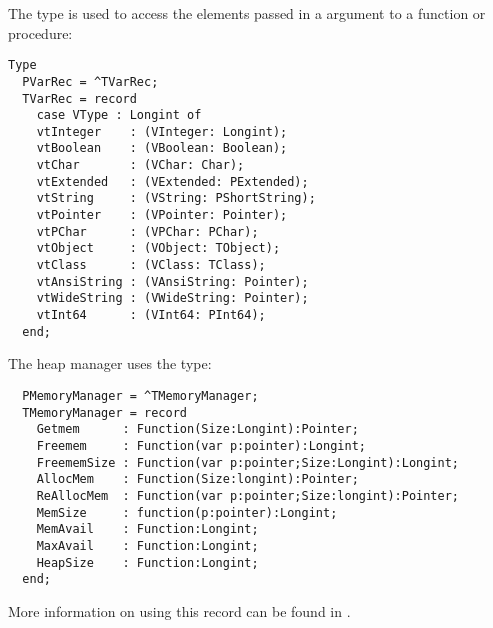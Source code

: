 \documentclass{report}
\begin{document}
The  type is used to access the elements passed in a  argument to a function or procedure:
\begin{verbatim}
Type
  PVarRec = ^TVarRec;
  TVarRec = record   
    case VType : Longint of
    vtInteger    : (VInteger: Longint);
    vtBoolean    : (VBoolean: Boolean);
    vtChar       : (VChar: Char);
    vtExtended   : (VExtended: PExtended);
    vtString     : (VString: PShortString);
    vtPointer    : (VPointer: Pointer);
    vtPChar      : (VPChar: PChar);
    vtObject     : (VObject: TObject);
    vtClass      : (VClass: TClass);  
    vtAnsiString : (VAnsiString: Pointer);   
    vtWideString : (VWideString: Pointer);  
    vtInt64      : (VInt64: PInt64);
  end;
\end{verbatim}
The heap manager uses the  type:
\begin{verbatim}
  PMemoryManager = ^TMemoryManager;
  TMemoryManager = record
    Getmem      : Function(Size:Longint):Pointer;
    Freemem     : Function(var p:pointer):Longint;
    FreememSize : Function(var p:pointer;Size:Longint):Longint;
    AllocMem    : Function(Size:longint):Pointer;
    ReAllocMem  : Function(var p:pointer;Size:longint):Pointer;
    MemSize     : function(p:pointer):Longint;
    MemAvail    : Function:Longint;
    MaxAvail    : Function:Longint;
    HeapSize    : Function:Longint;
  end;
\end{verbatim}
More information on using this record can be found in \progref.
\end{document}
